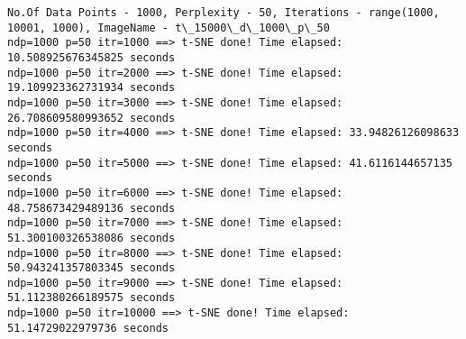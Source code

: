 \documentclass[11pt]{article}
\begin{document}
    \begin{Verbatim}[commandchars=\\\{\}]
No.Of Data Points - 1000, Perplexity - 50, Iterations - range(1000, 10001, 1000), ImageName - t\_15000\_d\_1000\_p\_50
ndp=1000 p=50 itr=1000 ==> t-SNE done! Time elapsed: 10.508925676345825 seconds
ndp=1000 p=50 itr=2000 ==> t-SNE done! Time elapsed: 19.109923362731934 seconds
ndp=1000 p=50 itr=3000 ==> t-SNE done! Time elapsed: 26.708609580993652 seconds
ndp=1000 p=50 itr=4000 ==> t-SNE done! Time elapsed: 33.94826126098633 seconds
ndp=1000 p=50 itr=5000 ==> t-SNE done! Time elapsed: 41.6116144657135 seconds
ndp=1000 p=50 itr=6000 ==> t-SNE done! Time elapsed: 48.758673429489136 seconds
ndp=1000 p=50 itr=7000 ==> t-SNE done! Time elapsed: 51.300100326538086 seconds
ndp=1000 p=50 itr=8000 ==> t-SNE done! Time elapsed: 50.943241357803345 seconds
ndp=1000 p=50 itr=9000 ==> t-SNE done! Time elapsed: 51.112380266189575 seconds
ndp=1000 p=50 itr=10000 ==> t-SNE done! Time elapsed: 51.14729022979736 seconds

    \end{Verbatim}

    \begin{center}
    \end{center}
    { \hspace*{\fill} \\}
    
    \begin{center}
    \end{center}
    { \hspace*{\fill} \\}
    
    \begin{center}
    \end{center}
    { \hspace*{\fill} \\}
    
    \begin{center}
    \end{center}
    { \hspace*{\fill} \\}
    
    \begin{center}
    \end{center}
    { \hspace*{\fill} \\}
    
\end{document}
